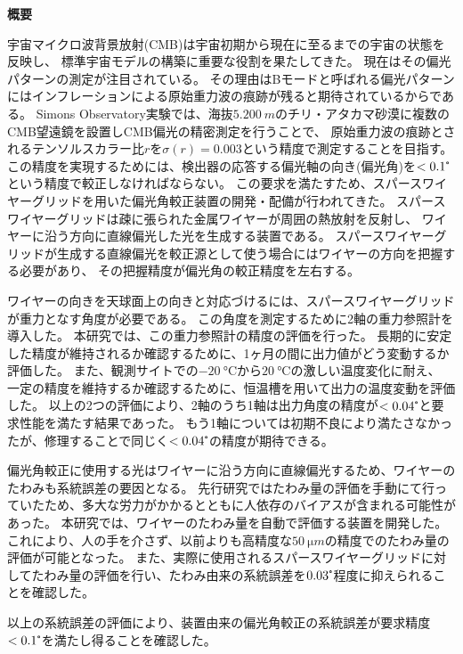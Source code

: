 \documentclass[../../main.tex]{subfiles}
\begin{document}
\begin{center}
\Large\textbf{概要}
\end{center}
\indent 宇宙マイクロ波背景放射(CMB)は宇宙初期から現在に至るまでの宇宙の状態を反映し、
標準宇宙モデルの構築に重要な役割を果たしてきた。
現在はその偏光パターンの測定が注目されている。
その理由はBモードと呼ばれる偏光パターンにはインフレーションによる原始重力波の痕跡が残ると期待されているからである。
Simons Observatory実験では、海抜$\SI{5,200}{m}$のチリ・アタカマ砂漠に複数のCMB望遠鏡を設置しCMB偏光の精密測定を行うことで、
原始重力波の痕跡とされるテンソルスカラー比$r$を$\sigma(r)=0.003$という精度で測定することを目指す。
この精度を実現するためには、検出器の応答する偏光軸の向き(偏光角)を$<0.1\tcdegree$という精度で較正しなければならない。
この要求を満たすため、スパースワイヤーグリッドを用いた偏光角較正装置の開発・配備が行われてきた。
スパースワイヤーグリッドは疎に張られた金属ワイヤーが周囲の熱放射を反射し、
ワイヤーに沿う方向に直線偏光した光を生成する装置である。
スパースワイヤーグリッドが生成する直線偏光を較正源として使う場合にはワイヤーの方向を把握する必要があり、
その把握精度が偏光角の較正精度を左右する。

ワイヤーの向きを天球面上の向きと対応づけるには、スパースワイヤーグリッドが重力となす角度が必要である。
この角度を測定するために2軸の重力参照計を導入した。
本研究では、この重力参照計の精度の評価を行った。
長期的に安定した精度が維持されるか確認するために、1ヶ月の間に出力値がどう変動するか評価した。
また、観測サイトでの$\SI{-20}{\degreeCelsius}$から$\SI{20}{\degreeCelsius}$の激しい温度変化に耐え、
一定の精度を維持するか確認するために、恒温槽を用いて出力の温度変動を評価した。
以上の2つの評価により、2軸のうち1軸は出力角度の精度が$<0.04\tcdegree$と要求性能を満たす結果であった。
もう1軸については初期不良により満たさなかったが、修理することで同じく$<0.04\tcdegree$の精度が期待できる。


偏光角較正に使用する光はワイヤーに沿う方向に直線偏光するため、ワイヤーのたわみも系統誤差の要因となる。
先行研究ではたわみ量の評価を手動にて行っていたため、多大な労力がかかるとともに人依存のバイアスが含まれる可能性があった。
本研究では、ワイヤーのたわみ量を自動で評価する装置を開発した。
これにより、人の手を介さず、以前よりも高精度な$\SI{50}{\micro m}$の精度でのたわみ量の評価が可能となった。
また、実際に使用されるスパースワイヤーグリッドに対してたわみ量の評価を行い、たわみ由来の系統誤差を$0.03\tcdegree$程度に抑えられることを確認した。

以上の系統誤差の評価により、装置由来の偏光角較正の系統誤差が要求精度$<0.1\tcdegree$を満たし得ることを確認した。
\end{document}
